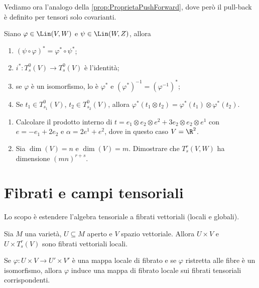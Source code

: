 Vediamo ora l'analogo della \cref{prop:ProprietaPushForward}, dove però il pull-back è definito per tensori solo covarianti.

\begin{proposition}
	Siano $\varphi\in \Lin(V,W)$ e $\psi\in \Lin(W,Z)$, allora
	\begin{enumerate}
		\item $(\psi\circ\varphi)^*=\varphi^*\circ\psi^*$;
		\item $i^*:T_s^0(V) \to T_s^0(V)$ è l'identità;
		\item se $\varphi$ è un isomorfismo, lo è $\varphi^*$ e $(\varphi^*)^{-1} = (\varphi^{-1})^*$;
		\item Se $t_1\in T_{s_1}^0(V)$, $t_2\in T_{s_2}^0(V)$, allora $\varphi^*(t_1\otimes t_2) = \varphi^*(t_1)\otimes \varphi^*(t_2)$. %
	\end{enumerate}
\end{proposition}

\begin{exercise}
	\begin{enumerate}
		\item Calcolare il prodotto interno di $t=e_1\otimes e_2\otimes e^2+3e_2\otimes e_2\otimes e^1$ con $e = -e_1+2e_2$ e $\alpha = 2e^1+e^2$, dove in questo caso $V=\R^2$.
		\item Sia $\dim(V) = n$ e $\dim(V) = m$. Dimostrare che $T_s^r(V,W)$ ha dimensione $(mn)^{r+s}$.
	\end{enumerate}
\end{exercise}

\section{Fibrati e campi tensoriali}

Lo scopo è estendere l'algebra tensoriale a fibrati vettoriali (locali e globali).


Sia $M$ una varietà, $U\subseteq M$ aperto e $V$ spazio vettoriale. Allora $U\times V$ e $U\times T_s^r(V)$ sono fibrati vettoriali locali.

Se $\varphi:U\times V \to U'\times V'$ è una mappa locale di fibrato e se $\varphi$ ristretta alle fibre è un isomorfismo, allora $\varphi$ induce una mappa di fibrato locale sui fibrati tensoriali corrispondenti.

